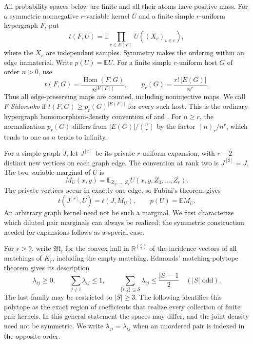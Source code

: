 \documentclass[a4paper,11pt,reqno]{amsart}
\theoremstyle{plain}
\theoremstyle{definition}
\theoremstyle{remark}
\begin{document}
All probability spaces below are finite and all their atoms have
positive mass.  For a symmetric nonnegative $r$-variable kernel $U$
and a finite simple $r$-uniform hypergraph $F$, put
\[
 t(F,U)=\mathbb E\prod_{e\in E(F)}U((X_v)_{v\in e}),
\]
where the $X_v$ are independent samples.  Symmetry makes the ordering
within an edge immaterial.  Write $p(U)=\mathbb E U$.
For a finite simple $r$-uniform host $G$ of order $n>0$, use
\[
 t(F,G)=\frac{\operatorname{Hom}(F,G)}{n^{|V(F)|}},
 \qquad p_r(G)=\frac{r!\,|E(G)|}{n^r}.
\]
Thus all edge-preserving maps are counted, including noninjective maps.
We call $F$ \emph{Sidorenko} if
$t(F,G)\ge p_r(G)^{|E(F)|}$ for every such host.  This is the
ordinary hypergraph homomorphism-density convention of
\citet{conlonleesidorenko2024} and \citet{niespiro2025}.
For $n\ge r$, the normalization $p_r(G)$ differs from
$|E(G)|/\binom nr$ by the
factor $(n)_r/n^r$, which tends to one as $n$ tends to infinity.

For a simple graph $J$, let $J^{[r]}$ be its private $r$-uniform
expansion, with $r-2$ distinct new vertices on each graph edge.
The convention at rank two is $J^{[2]}=J$.
The two-variable marginal of $U$ is
\[
 M_U(x,y)=\mathbb E_{Z_3,\ldots,Z_r}U(x,y,Z_3,\ldots,Z_r).
\]
The private vertices occur in exactly one edge, so Fubini's theorem gives
\begin{equation}\label{density-expansion-identity}
 t(J^{[r]},U)=t(J,M_U),\qquad p(U)=\mathbb E M_U.
\end{equation}
An arbitrary graph kernel need not be such a marginal.  We first
characterize which diluted pair marginals can always be realized;
the symmetric construction needed for expansions follows as a
special case.

For $r\ge2$, write $\mathfrak M_r$ for the convex hull in
$\mathbb R^{\binom r2}$ of the incidence vectors of all matchings
of $K_r$, including the empty matching.  Edmonds' matching-polytope
theorem \citep[Section~2, Theorem~(P)]{edmonds1965matching} gives its description
\begin{equation}\label{density-matching-inequalities}
 \lambda_{ij}\ge0,\qquad
 \sum_{j\ne i}\lambda_{ij}\le1,\qquad
 \sum_{\{i,j\}\subseteq S}\lambda_{ij}\le\frac{|S|-1}{2}
 \quad (|S|\text{ odd}).
\end{equation}
The last family may be restricted to $|S|\ge3$.
The following identifies this polytope as the exact region of
coefficients that realize every collection of finite pair kernels.
In this general statement the spaces may differ, and the joint
density need not be symmetric.  We write $\lambda_{ji}=\lambda_{ij}$
when an unordered pair is indexed in the opposite order.
\end{document}
